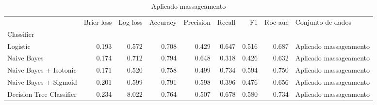 \begin{table}
\centering
\caption{Aplicado massageamento}
\label{Aplicado massageamento 1}
\begin{tabular}{lrrrrrrrl}
\toprule
{} &  Brier  loss &  Log loss &  Accuracy  &  Precision  &  Recall  &    F1  &  Roc auc  &       Conjunto de dados \\
Classifier               &              &           &            &             &          &        &           &                         \\
\midrule
Logistic                 &        0.193 &     0.572 &      0.708 &       0.429 &    0.647 &  0.516 &     0.687 &  Aplicado massageamento \\
Naive Bayes              &        0.174 &     0.712 &      0.794 &       0.648 &    0.318 &  0.426 &     0.632 &  Aplicado massageamento \\
Naive Bayes + Isotonic   &        0.171 &     0.520 &      0.758 &       0.499 &    0.734 &  0.594 &     0.750 &  Aplicado massageamento \\
Naive Bayes + Sigmoid    &        0.201 &     0.599 &      0.791 &       0.598 &    0.396 &  0.476 &     0.656 &  Aplicado massageamento \\
Decision Tree Classifier &        0.234 &     8.022 &      0.764 &       0.507 &    0.678 &  0.580 &     0.734 &  Aplicado massageamento \\
\bottomrule
\end{tabular}
\end{table}

